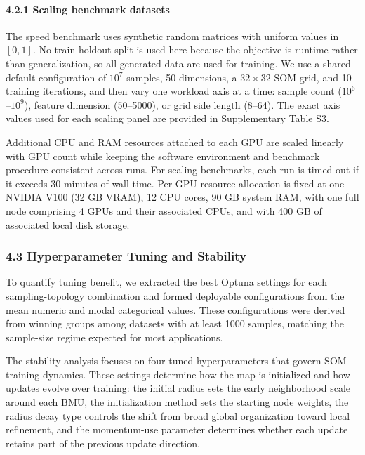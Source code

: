 \documentclass[
]{article}
\providecommand{\DIFadd}[1]{{\protect\color{blue} #1}} %
\providecommand{\DIFaddbegin}{} %
\providecommand{\DIFaddend}{} %
\begin{document}
\DIFaddend \paragraph{4.2.1 Scaling benchmark
datasets}\label{scaling-benchmark-datasets}

The speed benchmark uses synthetic random matrices with uniform values
in \([0,1]\). No train-holdout split is used here because the objective
is runtime rather than generalization, so all generated data are used
for training. We use a shared default configuration of \(10^7\) samples,
50 dimensions, a \(32 \times 32\) SOM grid, and 10 training iterations,
and then vary one workload axis at a time: sample count
(\(10^6\)--\(10^9\)), feature dimension (50--5000), or grid side length
(8--64). The exact axis values used for each scaling panel are provided
in Supplementary Table S3.

Additional CPU and RAM resources attached to each GPU are scaled
linearly with GPU count while keeping the software environment and
benchmark procedure consistent across runs. For scaling benchmarks, each
run is timed out if it exceeds 30 minutes of wall time. Per-GPU resource
allocation is fixed at one NVIDIA V100 (32 GB VRAM), 12 CPU cores, 90 GB
system RAM, with one full node comprising 4 GPUs and their associated
CPUs, and with 400 GB of associated local disk storage.

\subsubsection{4.3 Hyperparameter Tuning and
Stability}\label{hyperparameter-tuning-and-stability}

To quantify  \DIFaddbegin \DIFadd{tuning }\DIFaddend benefit, we  \DIFaddbegin \DIFadd{extracted the best Optuna settings for
each sampling-topology combination and formed deployable configurations
from the mean numeric and modal categorical values. These configurations
were derived from winning groups among datasets with at least 1000
samples, matching the sample-size regime expected for most applications.
}\DIFaddend

The stability analysis focuses on four tuned hyperparameters that govern
SOM training dynamics. These settings determine how the map is
initialized and how updates evolve over training: the initial radius
sets the early neighborhood scale around each BMU, the initialization
method sets the starting node weights, the radius decay type controls
the shift from broad global organization toward local refinement, and
the momentum-use parameter determines whether each update retains part
of the previous update direction.
\end{document}
